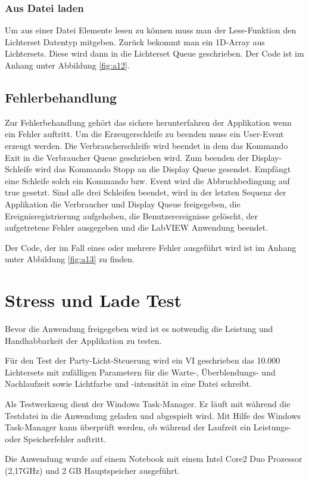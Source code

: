 \subsubsection{Aus Datei laden}
Um aus einer Datei Elemente lesen zu können muss man der Lese-Funktion den Lichterset Datentyp mitgeben. Zurück bekommt man ein 1D-Array aus Lichtersets. Diese wird dann in die Lichterset Queue geschrieben. Der Code ist im Anhang unter Abbildung \ref{fig:a12}.


\subsection{Fehlerbehandlung}
\label{chap:fehler}
Zur Fehlerbehandlung gehört das sichere herunterfahren der Applikation wenn ein Fehler auftritt. Um die Erzeugerschleife zu beenden muss ein User-Event erzeugt werden. Die Verbraucherschleife wird beendet in dem das Kommando Exit in die Verbraucher Queue geschrieben wird. Zum beenden der Display-Schleife wird das Kommando Stopp an die Display Queue gesendet. Empfängt eine Schleife solch ein Kommando bzw. Event wird die Abbruchbedingung auf true gesetzt. Sind alle drei Schleifen beendet, wird in der letzten Sequenz der Applikation die Verbraucher und Display Queue freigegeben, die Ereignisregistrierung aufgehoben, die Benutzerereignisse gelöscht, der aufgetretene Fehler ausgegeben und die LabVIEW Anwendung beendet.

Der Code, der im Fall eines oder mehrere Fehler ausgeführt wird ist im Anhang unter Abbildung \ref{fig:a13} zu finden.


\section{Stress und Lade Test}		
Bevor die Anwendung freigegeben wird ist es notwendig die Leistung und Handhabbarkeit der Applikation zu testen. 

Für den Test der Party-Licht-Steuerung wird ein VI geschrieben das 10.000 Lichtersets mit zufälligen Parametern für die Warte-, Überblendungs- und Nachlaufzeit sowie Lichtfarbe und -intensität in eine Datei schreibt. 

Als Testwerkzeug dient der Windows Task-Manager. Er läuft mit während die Testdatei in die Anwendung geladen und abgespielt wird. Mit Hilfe des Windows Task-Manager kann überprüft werden, ob während der Laufzeit ein Leistungs- oder Speicherfehler auftritt. 

Die Anwendung wurde auf einem Notebook mit einem Intel Core2 Duo Prozessor (2,17GHz) und 2 GB Hauptspeicher ausgeführt. 

